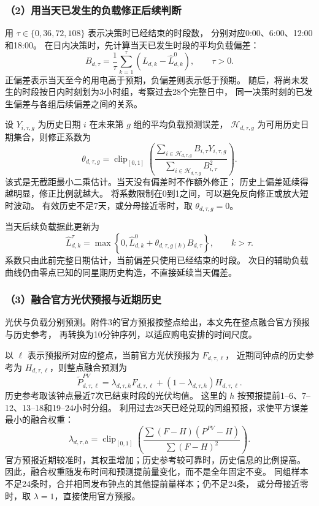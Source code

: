 \subsubsection*{（2）用当天已发生的负载修正后续判断}

用 $\tau\in\{0,36,72,108\}$ 表示决策时已经结束的时段数，
分别对应0:00、6:00、12:00和18:00。
在日内决策时，先计算当天已发生时段的平均负载偏差：
\begin{equation}
B_{d,\tau}=\frac{1}{\tau}\sum_{k=1}^{\tau}
\left(L_{d,k}-\widehat L^{0}_{d,k}\right),\qquad \tau>0.
\end{equation}
正偏差表示当天至今的用电高于预期，负偏差则表示低于预期。
随后，将尚未发生的时段按日内时刻划为3小时组，考察过去28个完整日中，
同一决策时刻的已发生偏差与各组后续偏差之间的关系。

设 $Y_{i,\tau,g}$ 为历史日期 $i$ 在未来第 $g$ 组的平均负载预测误差，
$\mathcal H_{d,\tau,g}$ 为可用历史日期集合，则修正系数为
\begin{equation}
\theta_{d,\tau,g}=\operatorname{clip}_{[0,1]}
\left(\frac{\sum_{i\in\mathcal H_{d,\tau,g}}B_{i,\tau}Y_{i,\tau,g}}
{\sum_{i\in\mathcal H_{d,\tau,g}}B_{i,\tau}^{2}}\right).
\end{equation}
该式是无截距最小二乘估计。当天没有偏差时不作额外修正；
历史上偏差延续得越明显，修正比例就越大。
将系数限制在0到1之间，可以避免反向修正或放大短时波动。
有效历史不足7天，或分母接近零时，取 $\theta_{d,\tau,g}=0$。

当天后续负载据此更新为
\begin{equation}
\widehat L_{d,k}^{\tau}
=\max\left\{0,\widehat L^{0}_{d,k}
+\theta_{d,\tau,g(k)}B_{d,\tau}\right\},\qquad k>\tau.
\end{equation}
系数只由此前完整日期估计，当前偏差只使用已经结束的时段。
次日的辅助负载曲线仍由零点已知的同星期历史构造，不直接延续当天偏差。

\subsubsection*{（3）融合官方光伏预报与近期历史}

光伏与负载分别预测。附件3的官方预报按整点给出，本文先在整点融合官方预报与历史参考，
再转换为10分钟序列，以适应购电安排的时间尺度。

以 $\ell$ 表示预报所对应的整点，当前官方光伏预报为 $F_{d,\tau,\ell}$，
近期同钟点的历史参考为 $H_{d,\tau,\ell}$，则整点融合预测为
\begin{equation}
\widetilde P^{PV}_{d,\tau,\ell}
=\lambda_{d,\tau,h}F_{d,\tau,\ell}
+(1-\lambda_{d,\tau,h})H_{d,\tau,\ell}.
\end{equation}
历史参考取该钟点最近7次已结束时段的光伏均值。
这里的 $h$ 按预报提前1--6、7--12、13--18和19--24小时分组。
利用过去28天已经兑现的同组预报，求使平方误差最小的融合权重：
\begin{equation}
\lambda_{d,\tau,h}
=\operatorname{clip}_{[0,1]}
\left(\frac{\sum(F-H)(P^{PV}-H)}{\sum(F-H)^2}\right).
\end{equation}
官方预报近期较准时，其权重增加；历史参考较可靠时，历史信息的比例提高。
因此，融合权重随发布时间和预测提前量变化，而不是全年固定不变。
同组样本不足24条时，合并相同发布钟点的其他提前量样本；仍不足24条，
或分母接近零时，取 $\lambda=1$，直接使用官方预报。

